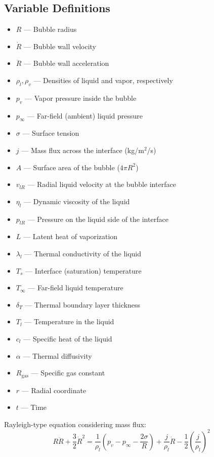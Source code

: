 \documentclass[aps,pre,twocolumn,superscriptaddress,floatfix]{revtex4-2}
\begin{document}
\subsection*{Variable Definitions}
\begin{itemize}
    \item $R$ — Bubble radius
    \item $\dot{R}$ — Bubble wall velocity
    \item $\ddot{R}$ — Bubble wall acceleration
    \item $\rho_l, \rho_v$ — Densities of liquid and vapor, respectively
    \item $p_v$ — Vapor pressure inside the bubble
    \item $p_{\infty}$ — Far-field (ambient) liquid pressure
    \item $\sigma$ — Surface tension
    \item $j$ — Mass flux across the interface (kg/m$^2$/s)
    \item $A$ — Surface area of the bubble ($4 \pi R^2$)
    \item $v_{lR}$ — Radial liquid velocity at the bubble interface
    \item $\eta_l$ — Dynamic viscosity of the liquid
    \item $p_{lR}$ — Pressure on the liquid side of the interface
    \item $L$ — Latent heat of vaporization
    \item $\lambda_l$ — Thermal conductivity of the liquid
    \item $T_s$ — Interface (saturation) temperature
    \item $T_{\infty}$ — Far-field liquid temperature
    \item $\delta_T$ — Thermal boundary layer thickness
    \item $T_l$ — Temperature in the liquid
    \item $c_l$ — Specific heat of the liquid
    \item $\alpha$ — Thermal diffusivity
    \item $R_{\text{gas}}$ — Specific gas constant
    \item $r$ — Radial coordinate
    \item $t$ — Time
\end{itemize}

Rayleigh-type equation considering mass flux:
\begin{equation}
R \ddot{R} + \frac{3}{2} \dot{R}^2 = \frac{1}{\rho_l} \left( p_v - p_{\infty} - \frac{2\sigma}{R} \right) + \frac{j}{\rho_l} \dot{R} - \frac{1}{2} \left( \frac{j}{\rho_l} \right)^2
\end{equation}
\end{document}
